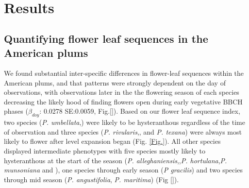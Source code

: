 \documentclass{article}[11pt]
\begin{document}




\section*{Results}
\subsection*{Quantifying flower leaf sequences in the American plums}
We found substantial inter-specific differences in flower-leaf sequences within the American plums, and that patterns were strongly dependent on the day of observations, with observations later in the the flowering season of each species decreasing the likely hood of finding flowers open during early vegetative BBCH phases ($\beta_{doy}$: 0.0278 SE:0.0059, Fig.\ref{}). Based on our flower leaf sequence index, two species (\textit{P. umbellata},) were likely to be hysteranthous regardless of the time of observation and three species (\textit{P. rivularis},, and \textit{P. texana}) were always most likely to flower after level expansion began (Fig. \ref{Fig.}). All other species displayed intermediate phenotypes with five species mostly likely to hysteranthous at the start of the season (\textit{P. alleghaniensis},,\textit{P. hortulana},\textit{P. munsoniana} and ), one species through early season (\textit{P gracilis}) and two species through mid season (\textit{P. angustifolia}, \textit{P. maritima}) (Fig \ref{}). %
\end{document}

